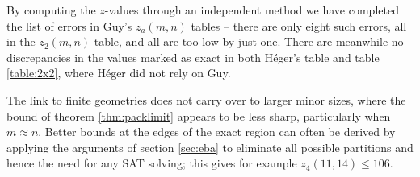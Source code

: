 \documentclass[10pt,a4paper]{article}
\theoremstyle{definition}
\begin{document}
	By computing the $z$-values through an independent method we have completed the list of errors in Guy's $z_a(m,n)$ tables -- there are only eight such errors, all in the $z_2(m,n)$ table, and all are too low by just one. There are meanwhile no discrepancies in the values marked as exact in both Héger's table and table \ref{table:2x2}, where Héger did not rely on Guy.
	
	The link to finite geometries does not carry over to larger minor sizes, where the bound of theorem \ref{thm:packlimit} appears to be less sharp, particularly when $m\approx n$. Better bounds at the edges of the exact region can often be derived by applying the arguments of section \ref{sec:eba} to eliminate all possible partitions and hence the need for any SAT solving; this gives for example $z_4(11,14)\le106$.
	
\end{document}
